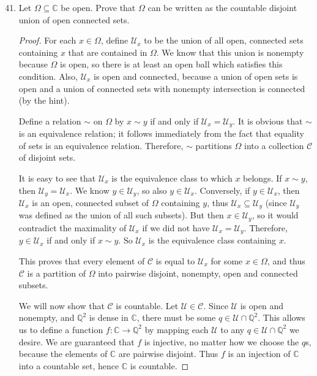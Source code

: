 \documentclass[10pt]{article}
\newcommand{\Q}{\mathbb{Q}}
\newcommand{\C}{\mathbb{C}}
\newcommand{\U}{\mathcal{U}}
\begin{document}
\begin{enumerate}
\setcounter{enumi}{40}
\item Let $\Omega \subseteq \C$ be open.  Prove that $\Omega$ can be written as the countable disjoint union of open connected sets.

\begin{proof}
For each $x \in \Omega$, define $\U_x$ to be the union of all open, connected sets containing $x$ that are contained in $\Omega$.  We know that this union is nonempty because $\Omega$ is open, so there is at least an open ball which satisfies this condition.  Also, $\U_x$ is open and connected, because a union of open sets is open and a union of connected sets with nonempty intersection is connected (by the hint).

Define a relation $\sim$ on $\Omega$ by $x \sim y$ if and only if $\U_x = \U_y$.  It is obvious that $\sim$ is an equivalence relation; it follows immediately from the fact that equality of sets is an equivalence relation.  Therefore, $\sim$ partitions $\Omega$ into a collection $\mathcal{C}$ of disjoint sets.

It is easy to see that $\U_x$ is the equivalence class to which $x$ belongs.  If $x \sim y$, then $\U_y = \U_x$.  We know $y \in \U_y$, so also $y \in \U_x$.  Conversely, if $y \in \U_x$, then $\U_x$ is an open, connected subset of $\Omega$ containing $y$, thus $\U_x \subseteq \U_y$ (since $\U_y$ was defined as the union of all such subsets).  But then $x \in \U_y$, so it would contradict the maximality of $\U_x$ if we did not have $\U_x = \U_y$.  Therefore, $y \in \U_x$ if and only if $x \sim y$.  So $\U_x$ is the equivalence class containing $x$.

This proves that every element of $\mathcal{C}$ is equal to $\U_x$ for some $x \in \Omega$, and thus $\mathcal{C}$ is a partition of $\Omega$ into pairwise disjoint, nonempty, open and connected subsets.

We will now show that $\mathcal{C}$ is countable.  Let $\U \in \mathcal{C}$.  Since $\U$ is open and nonempty, and $\Q^2$ is dense in $\C$, there must be some $q \in \U \cap \Q^2$.  This allows us to define a function $f: \C \rightarrow \Q^2$ by mapping each $\U$ to any $q \in \U \cap \Q^2$ we desire.  We are guaranteed that $f$ is injective, no matter how we choose the $q$s, because the elements of $\C$ are pairwise disjoint.  Thus $f$ is an injection of $\C$ into a countable set, hence $\C$ is countable.
\end{proof}


\end{enumerate}
\end{document}
